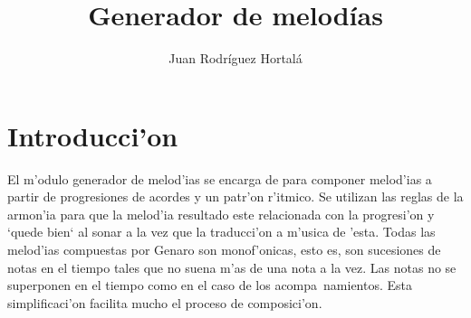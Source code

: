 ﻿\documentclass[a4paper,12pt]{article}
\author{Juan Rodr\'iguez Hortal\'a}
\title{Generador de melod\'ias}
\begin{document}
\maketitle
\tableofcontents
\section{Introducci'on}
El m'odulo generador de melod'ias se encarga de para componer melod'ias a partir de progresiones de acordes y un patr'on r'itmico. Se utilizan las reglas de la armon'ia para que la melod'ia resultado este relacionada con la progresi'on y `quede bien` al sonar a la vez que la traducci'on a m'usica de 'esta.
\newline
Todas las melod'ias compuestas por Genaro son monof'onicas, esto es, son sucesiones de notas en el tiempo tales que no suena m'as de una nota a la vez. Las notas no se superponen en el tiempo como en el caso de los acompa~namientos. Esta simplificaci'on facilita mucho el proceso de composici'on.
\end{document}
